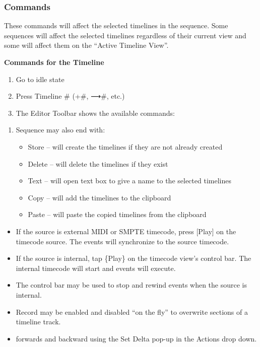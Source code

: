 \documentclass[
]{article}
\begin{document}
\hypertarget{commands}{%
\subsubsection{Commands}\label{commands}}

These commands will affect the selected timelines in the sequence. Some sequences will affect the selected timelines regardless of their current view and some will affect them on the ``Active Timeline View''.

\textbf{Commands for the Timeline}

\begin{enumerate}
\def\labelenumi{\arabic{enumi}.}
\item
  Go to idle state
\item
  Press Timeline \# (+\#, ⟶\#, etc.)
\item
  The Editor Toolbar shows the available commands:
\end{enumerate}

\begin{enumerate}
\def\labelenumi{\arabic{enumi}.}
\setcounter{enumi}{3}
\item
  Sequence may also end with:

  \begin{itemize}
  \item
    Store -- will create the timelines if they are not already created
  \item
    Delete -- will delete the timelines if they exist
  \item
    Text -- will open text box to give a name to the selected timelines
  \item
    Copy -- will add the timelines to the clipboard
  \item
    Paste -- will paste the copied timelines from the clipboard
  \end{itemize}
\end{enumerate}

\begin{itemize}
\item
  If the source is external MIDI or SMPTE timecode, press {[}Play{]} on the timecode source. The events will synchronize to the source timecode.
\item
  If the source is internal, tap \{Play\} on the timecode view's control bar. The internal timecode will start and events will execute.
\item
  The control bar may be used to stop and rewind events when the source is internal.
\item
  Record may be enabled and disabled ``on the fly'' to overwrite sections of a timeline track.
\item
  forwards and backward using the Set Delta pop-up in the Actions drop down.
\end{itemize}
\end{document}
